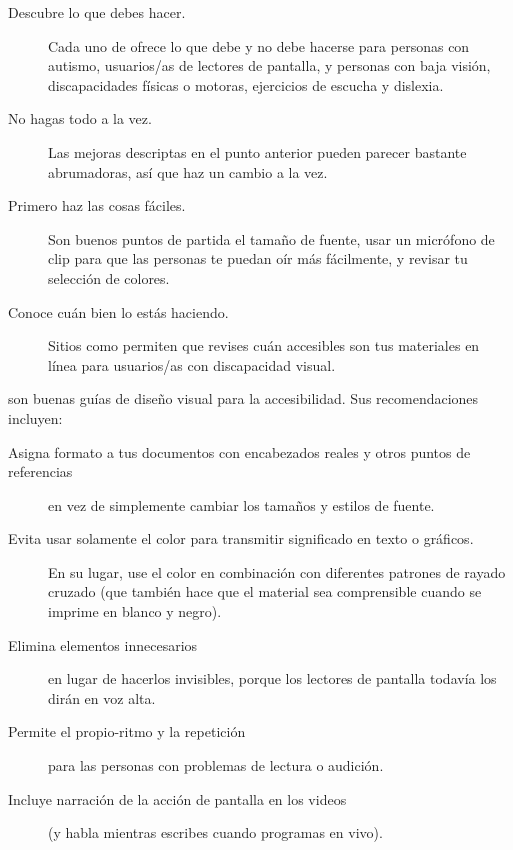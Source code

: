\begin{description}

\item[Descubre lo que debes hacer.]
   Cada uno de 
  ofrece lo que debe y no debe hacerse para personas con autismo,
  usuarios/as de lectores de pantalla,
  y personas con baja visión,
  discapacidades físicas o motoras,
  ejercicios de escucha
  y dislexia.

\item[No hagas todo a la vez.]
  Las mejoras descriptas en el punto anterior pueden parecer bastante abrumadoras,
  así que haz un cambio a la vez.

\item[Primero haz las cosas fáciles.]
  Son buenos puntos de partida
  el tamaño de fuente,
  usar un micrófono de clip para que las personas te puedan oír más fácilmente,
  y revisar tu selección de colores.

\item[Conoce cuán bien lo estás haciendo.]
  Sitios como  permiten que revises
  cuán accesibles son tus materiales en línea para usuarios/as con discapacidad visual.

\end{description}

\cite{Coom2012,Burg2015} son buenas guías de diseño visual para la accesibilidad.
Sus recomendaciones incluyen:

\begin{description}

\item[Asigna formato a tus documentos con encabezados reales y otros puntos de referencias]
  en vez de simplemente cambiar los tamaños y estilos de fuente.

\item[Evita usar solamente el color para transmitir significado en texto o gráficos.]
  En su lugar, use el color en combinación con diferentes patrones de rayado cruzado
  (que también hace que el material sea comprensible cuando se imprime en blanco y negro).

\item[Elimina elementos innecesarios]
  en lugar de hacerlos invisibles,
  porque los lectores de pantalla todavía los dirán en voz alta.

\item[Permite el propio-ritmo y la repetición]
  para las personas con problemas de lectura o audición.

\item[Incluye narración de la acción de pantalla en los videos]
  (y habla mientras escribes cuando programas en vivo).

\end{description}


